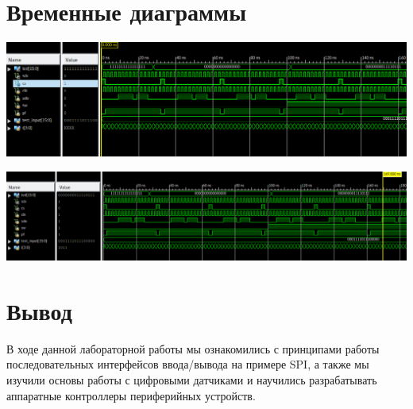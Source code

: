 \section{Временные диаграммы}
\begin{centering}
\includegraphics[width=\textwidth]{img/graph1.png}

\includegraphics[width=\textwidth]{img/graph2.png}
\end{centering}
\section{Вывод}
В ходе данной лабораторной работы мы ознакомились с принципами работы последовательных
интерфейсов ввода/вывода на примере SPI, а также мы изучили основы работы с
цифровыми датчиками и научились разрабатывать аппаратные контроллеры периферийных
устройств.

